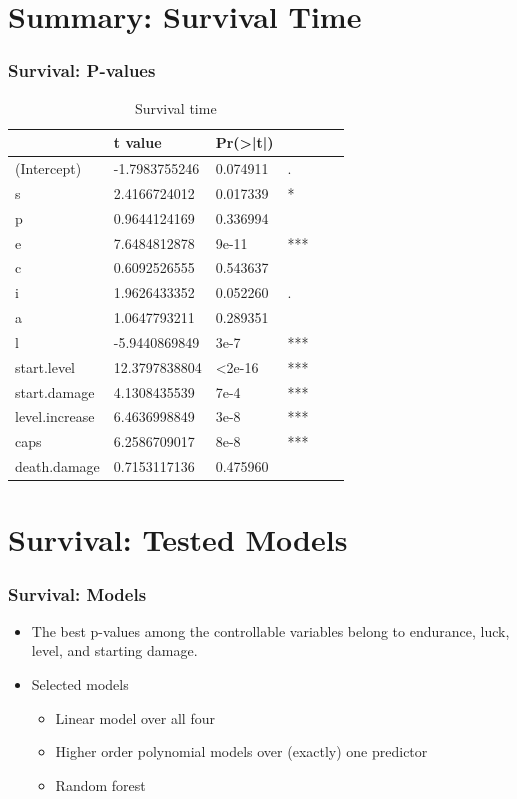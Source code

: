 \documentclass{beamer}
\begin{document}
\section{Summary: Survival Time}
\begin{frame}
  \frametitle{Survival: P-values}
  \begin{table}[]
    \centering
    \caption{Survival time}
    \label{table:survival.time}
    \begin{tabular}{l|lllll}
      &t value&Pr(>|t|)& \\ 
      \hline
      (Intercept)    &  -1.7983755246 & 0.074911&. \\ 
      s              &  2.4166724012  & 0.017339 &*\\
      p              &  0.9644124169  & 0.336994 &\\
      e              &  7.6484812878  & 9e-11&*** \\
      c              &  0.6092526555  & 0.543637& \\
      i              &  1.9626433352  & 0.052260& .\\
      a              &  1.0647793211  & 0.289351& \\
      l              &  -5.9440869849 & 3e-7&*** \\
      start.level    &  12.3797838804 & <2e-16&*** \\
      start.damage   &  4.1308435539  & 7e-4&*** \\
      level.increase &  6.4636998849  & 3e-8 &***\\
      caps           &  6.2586709017  & 8e-8&*** \\
      death.damage   &  0.7153117136  & 0.475960&\\
      \hline
    \end{tabular}
  \end{table}
\end{frame}

\section{Survival: Tested Models}
\begin{frame}
  \frametitle{Survival: Models}
  \begin{itemize}
  \item The best p-values among the controllable variables belong to endurance, luck, level, and starting damage.
  \item Selected models
    \begin{itemize}
    \item Linear model over all four
    \item Higher order polynomial models over (exactly) one predictor
    \item Random forest
    \end{itemize}
  \end{itemize}
\end{frame}
\end{document}
